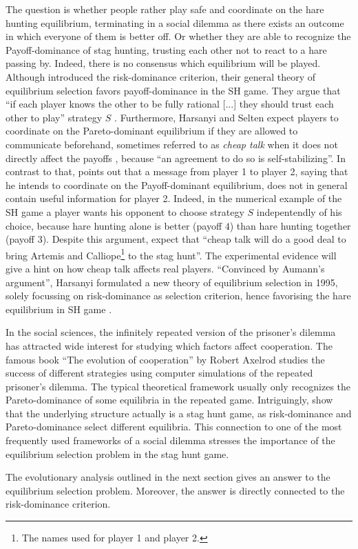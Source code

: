 The question is whether people rather play
safe and coordinate on the hare hunting equilibrium, terminating in a social
dilemma as there exists an outcome in which everyone of them is better off.
Or whether they are able to recognize the Payoff-dominance of stag hunting, 
trusting each other not to react to a hare passing by.
Indeed, there is no consensus which equilibrium will be played. 
Although \textcite{harsanyi_general_1988} introduced the 
risk-dominance criterion, their general theory of equilibrium 
selection favors payoff-dominance in the SH game. They argue that
``if each player knows the other to be fully rational [...] they should trust
each other to play'' strategy $S$ \parencite[89]{harsanyi_general_1988}.
Furthermore, Harsanyi and Selten expect players to coordinate on the
Pareto-dominant equilibrium if they are allowed to communicate beforehand,
sometimes referred to as \textit{cheap talk} when it does not directly affect
the payoffs \parencite[104]{farrell_cheap_1996}, 
because ``an agreement to do so is self-stabilizing''. 
In contrast to that,
\textcite{aumann_nash_1990} points out that a message from player 1 to 
player 2, saying that he intends to coordinate on the Payoff-dominant 
equilibrium, does not in general contain useful information for player 2. 
Indeed, in the numerical example of the SH game a player wants his
opponent to choose strategy $S$ indepentendly of his choice, because
hare hunting alone is better (payoff $4$) than hare hunting together 
(payoff $3$).
Despite this argument, 
\textcite[114]{farrell_cheap_1996} expect that 
``cheap talk will do a good deal to
bring Artemis and Calliope\footnote{The names
\textcite{farrell_cheap_1996} used for player 1 and player 2.} 
to the stag hunt''. The experimental evidence will give a hint on how cheap
talk affects real players. 
``Convinced by Aumann's argument'', Harsanyi formulated a new theory
of equilibrium selection in 1995, solely focussing on 
risk-dominance as selection criterion, hence favorising the hare 
equilibrium in SH game \parencite[92,94,96]{harsanyi_new_1995}. 

In the social sciences, the infinitely repeated version of the
prisoner's dilemma has attracted wide interest for studying which factors 
affect cooperation. The famous book ``The evolution of cooperation'' by Robert
Axelrod studies the success of different strategies using computer 
simulations of the repeated prisoner's dilemma. The typical theoretical
framework usually only recognizes the Pareto-dominance of some equilibria
in the repeated game. Intriguingly, \textcite{blonski_prisoners_2015} show
that the underlying structure actually is a stag hunt game, as risk-dominance
and Pareto-dominance select different equilibria. This connection to 
one of the most frequently used frameworks of a social dilemma stresses the
importance of the equilibrium selection problem in the stag hunt game.

The evolutionary analysis outlined in the next section gives an answer
to the equilibrium selection problem. Moreover, the answer is directly
connected to the risk-dominance criterion.
